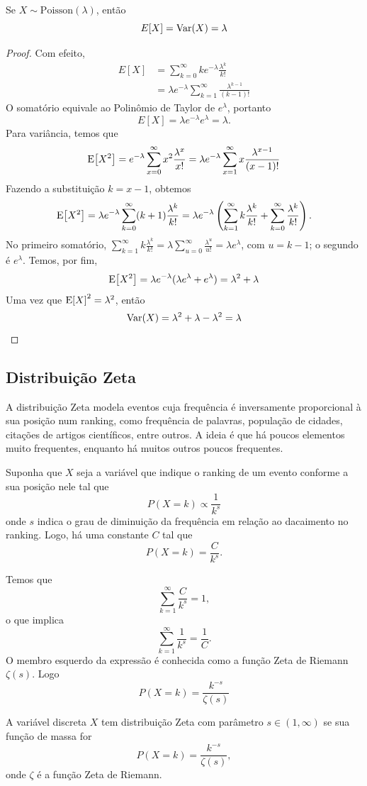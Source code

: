 \begin{prop:esperanca poisson}
Se $X \sim \mathrm{Poisson}(\lambda)$, então
\[
	E[X] = \mathrm{Var}\!\left(X\right) = \lambda
\]
\begin{proof}
	Com efeito,
	\begin{align*}
		E[X] & = \sum_{k = 0}^\infty k e^{-\lambda} \frac{\lambda^k}{k!}             \\
		     & = \lambda e^{-\lambda} \sum_{k=1}^\infty \frac{\lambda^{k-1}}{(k-1)!}
	\end{align*}
	O somatório equivale ao Polinômio de Taylor de $e^\lambda$, portanto
	\[
		E[X] = \lambda e^{-\lambda} e^{\lambda} = \lambda.
	\]
	Para variância, temos que
	\[
	    \mathrm{E}\!\left[X^2\right] = e^{-\lambda}\sum_{x=0}^\infty x^2 \frac{\lambda^x}{x!} =
		\lambda e^{-\lambda} \sum_{x=1}^\infty x \frac{\lambda^{x-1}}{(x-1)!}
	\]
	Fazendo a substituição $k = x - 1$, obtemos
	\[
	    \mathrm{E}\!\left[X^2\right] =
		\lambda e^{-\lambda} \sum_{k=0}^\infty (k + 1) \frac{\lambda^{k}}{k!} =
		\lambda e^{-\lambda} \left(\sum_{k=1}^\infty k \frac{\lambda^{k}}{k!} + \sum_{k=0}^\infty \frac{\lambda^{k}}{k!}\right).
	\]
	No primeiro somatório, $\sum_{k=1}^\infty k \frac{\lambda^k}{k!} = \lambda \sum_{u=0}^\infty \frac{\lambda^u}{u!} = \lambda e^\lambda$,
	com $u = k - 1$; o segundo é $e^\lambda$. Temos, por fim,
	\[
	    \mathrm{E}\!\left[X^2\right] = \lambda e^{-\lambda} (\lambda e^\lambda + e^\lambda) = \lambda^2 + \lambda
	\]
	Uma vez que $\mathrm{E}\!\left[X\right]^2 = \lambda^2$, então
	\[
	    \mathrm{Var}\!\left(X\right) = \lambda^2 + \lambda - \lambda^2 = \lambda
	\]
\end{proof}
\end{prop:esperanca poisson}

\subsection{Distribuição Zeta}

A distribuição Zeta modela eventos cuja frequência é inversamente proporcional à sua
posição num ranking, como frequência de palavras, população de cidades, citações de
artigos científicos, entre outros.
A ideia é que há poucos elementos muito frequentes, enquanto há muitos outros poucos
frequentes.

Suponha que $X$ seja a variável que indique o ranking de um evento conforme a sua posição
nele tal que
\[
    P(X = k) \propto \frac{1}{k^s}
\]
onde $s$ indica o grau de diminuição da frequência em relação ao dacaimento no ranking.
Logo, há uma constante $C$ tal que
\[
    P(X = k) = \frac{C}{k^s}.
\]

Temos que
\[
    \sum_{k=1}^\infty \frac{C}{k^s} = 1,
\]
o que implica
\[
    \sum_{k=1}^\infty \frac{1}{k^s} = \frac{1}{C}.
\]
O membro esquerdo da expressão é conhecida como a função Zeta de Riemann $\zeta(s)$.
Logo
\[
    P(X = k) = \frac{k^{-s}}{\zeta(s)}
\]

\begin{def:zeta}
A variável discreta $X$ tem distribuição Zeta com parâmetro $s \in (1, \infty)$
se sua função de massa for
\[
    P(X = k) = \frac{k^{-s}}{\zeta(s)},
\]
onde $\zeta$ é a função Zeta de Riemann.
\end{def:zeta}
